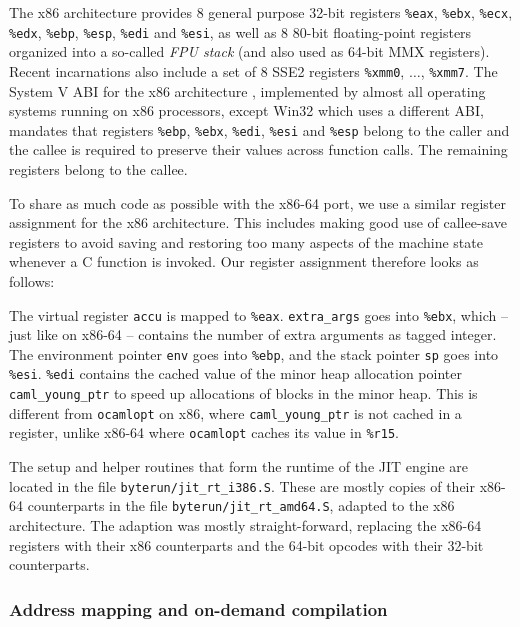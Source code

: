 \documentclass[12pt,a4paper,final]{article}
\begin{document}
The x86 architecture \cite{Intel10Vol1} provides $8$ general purpose 32-bit registers
\texttt{\%eax}, \texttt{\%ebx}, \texttt{\%ecx}, \texttt{\%edx}, \texttt{\%ebp}, \texttt{\%esp},
\texttt{\%edi} and \texttt{\%esi}, as well as $8$ 80-bit floating-point registers organized
into a so-called \emph{FPU stack} (and also used as 64-bit MMX registers). Recent incarnations also
include a set of $8$ SSE2 registers \texttt{\%xmm0}, $\ldots$, \texttt{\%xmm7}.
The System V ABI for the x86 architecture \cite{SCO97Abi386}, implemented by almost all
operating systems running on x86 processors, except Win32 which uses a different ABI,
mandates that registers \texttt{\%ebp}, \texttt{\%ebx}, \texttt{\%edi}, \texttt{\%esi}
and \texttt{\%esp} belong to the caller and the callee is required to preserve their
values across function calls. The remaining registers belong to the callee.

To share as much code as possible with the x86-64 port, we use a similar register assignment
for the x86 architecture. This includes making good use of callee-save registers to avoid
saving and restoring too many aspects of the machine state whenever a C function is
invoked. Our register assignment therefore looks as follows:

The virtual register \texttt{accu} is mapped to \texttt{\%eax}.
\texttt{extra\_args} goes into \texttt{\%ebx}, which -- just like on x86-64 -- contains
the number of extra arguments as tagged integer.
The environment pointer \texttt{env} goes into \texttt{\%ebp}, and
the stack pointer \texttt{sp} goes into \texttt{\%esi}.
\texttt{\%edi} contains the cached value of the minor heap allocation pointer
\texttt{caml\_young\_ptr} to speed up allocations of blocks in the minor heap. This
is different from \texttt{ocamlopt} on x86, where \texttt{caml\_young\_ptr} is not
cached in a register, unlike x86-64 where \texttt{ocamlopt} caches its value in \texttt{\%r15}.

The setup and helper routines that form the runtime of the JIT engine are located in the
file \texttt{byterun/jit\_rt\_i386.S}. These are mostly copies of their x86-64 counterparts
in the file \texttt{byterun/jit\_rt\_amd64.S}, adapted to the x86 architecture. The
adaption was mostly straight-forward, replacing the x86-64 registers with their x86
counterparts and the 64-bit opcodes with their 32-bit counterparts.

\subsubsection{Address mapping and on-demand compilation}
\end{document}
